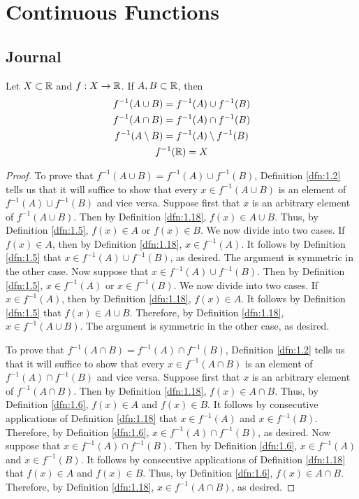 \documentclass[../main.tex]{subfiles}
\begin{document}
\chapter{Continuous Functions}\label{sct:9}
\section{Journal}
\begin{lemma}\label{lem:9.1}
    Let $X\subset\mathbb{R}$ and $f:X\to\mathbb{R}$. If $A,B\subset\mathbb{R}$, then
    \begin{gather*}
        f^{-1}(A\cup B) = f^{-1}(A)\cup f^{-1}(B)\\
        f^{-1}(A\cap B) = f^{-1}(A)\cap f^{-1}(B)\\
        f^{-1}(A\setminus B) = f^{-1}(A)\setminus f^{-1}(B)\\
        f^{-1}(\mathbb{R}) = X
    \end{gather*}
    \begin{proof}
        To prove that $f^{-1}(A\cup B)=f^{-1}(A)\cup f^{-1}(B)$, Definition \ref{dfn:1.2} tells us that it will suffice to show that every $x\in f^{-1}(A\cup B)$ is an element of $f^{-1}(A)\cup f^{-1}(B)$ and vice versa. Suppose first that $x$ is an arbitrary element of $f^{-1}(A\cup B)$. Then by Definition \ref{dfn:1.18}, $f(x)\in A\cup B$. Thus, by Definition \ref{dfn:1.5}, $f(x)\in A$ or $f(x)\in B$. We now divide into two cases. If $f(x)\in A$, then by Definition \ref{dfn:1.18}, $x\in f^{-1}(A)$. It follows by Definition \ref{dfn:1.5} that $x\in f^{-1}(A)\cup f^{-1}(B)$, as desired. The argument is symmetric in the other case. Now suppose that $x\in f^{-1}(A)\cup f^{-1}(B)$. Then by Definition \ref{dfn:1.5}, $x\in f^{-1}(A)$ or $x\in f^{-1}(B)$. We now divide into two cases. If $x\in f^{-1}(A)$, then by Definition \ref{dfn:1.18}, $f(x)\in A$. It follows by Definition \ref{dfn:1.5} that $f(x)\in A\cup B$. Therefore, by Definition \ref{dfn:1.18}, $x\in f^{-1}(A\cup B)$. The argument is symmetric in the other case, as desired.\par
        To prove that $f^{-1}(A\cap B)=f^{-1}(A)\cap f^{-1}(B)$, Definition \ref{dfn:1.2} tells us that it will suffice to show that every $x\in f^{-1}(A\cap B)$ is an element of $f^{-1}(A)\cap f^{-1}(B)$ and vice versa. Suppose first that $x$ is an arbitrary element of $f^{-1}(A\cap B)$. Then by Definition \ref{dfn:1.18}, $f(x)\in A\cap B$. Thus, by Definition \ref{dfn:1.6}, $f(x)\in A$ and $f(x)\in B$. It follows by consecutive applications of Definition \ref{dfn:1.18} that $x\in f^{-1}(A)$ and $x\in f^{-1}(B)$. Therefore, by Definition \ref{dfn:1.6}, $x\in f^{-1}(A)\cap f^{-1}(B)$, as desired. Now suppose that $x\in f^{-1}(A)\cap f^{-1}(B)$. Then by Definition \ref{dfn:1.6}, $x\in f^{-1}(A)$ and $x\in f^{-1}(B)$. It follows by consecutive applications of Definition \ref{dfn:1.18} that $f(x)\in A$ and $f(x)\in B$. Thus, by Definition \ref{dfn:1.6}, $f(x)\in A\cap B$. Therefore, by Definition \ref{dfn:1.18}, $x\in f^{-1}(A\cap B)$, as desired.\par

\end{proof}
\end{lemma}
\end{document}

